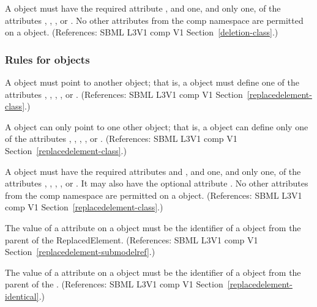 \begin{sbmlenum}
 { A \Deletion object must have the
  required attribute , and one, and only one, of the attributes
  , 
  , , or .
  No other attributes from the comp namespace are permitted on a
  \Deletion object.
  (References: SBML L3V1 comp V1 Section~\ref{deletion-class}.) }

\end{sbmlenum} \subsubsection*{Rules for  objects} \begin{sbmlenum}

 { A \ReplacedElement object must point to another object; that is,
  a \ReplacedElement object must define one of the attributes , 
  , , , or . 
  (References: SBML L3V1 comp V1 Section~\ref{replacedelement-class}.) }


 { A \ReplacedElement object can only point to one other object; that is,
  a \ReplacedElement object can define only one of the attributes  , 
  , , , or .
  (References: SBML L3V1 comp V1 Section~\ref{replacedelement-class}.) }


 { A \ReplacedElement object must have the
  required attributes  and , and one, 
  and only one, of the attributes , 
  , , , or .
  It may also have the optional attribute .
  No other attributes from the comp namespace are permitted on a
  \ReplacedElement object.
  (References: SBML L3V1 comp V1 Section~\ref{replacedelement-class}.) }


 { The value of a  attribute on a
  \ReplacedElement object must be the identifier of a \Submodel object
  from the parent \Model of the ReplacedElement.  
  (References: SBML L3V1 comp V1 Section~\ref{replacedelement-submodelref}.) }


 { The value of a  attribute on a
  \ReplacedElement object must be the identifier of a \Deletion object
  from the parent \Model of the \ReplacedElement.  
  (References: SBML L3V1 comp V1 Section~\ref{replacedelement-identical}.) }



\end{sbmlenum}
